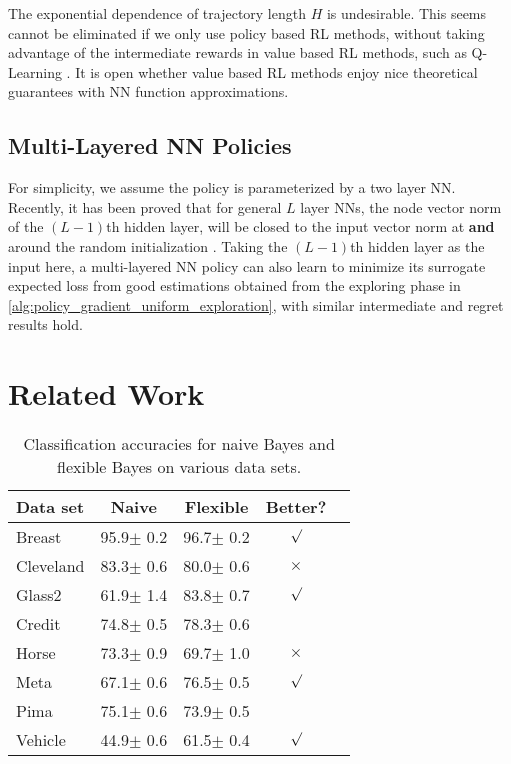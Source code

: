 The exponential dependence of trajectory length $H$ is undesirable. This seems cannot be eliminated if we only use policy based RL methods, without taking advantage of the intermediate rewards in value based RL methods, such as Q-Learning \citep{jin2018q}. It is open whether value based RL methods enjoy nice theoretical guarantees with NN function approximations.

\subsection{Multi-Layered NN Policies}

For simplicity, we assume the policy is parameterized by a two layer NN. Recently, it has been proved that for general $L$ layer NNs, the node vector norm of the $(L-1)$th hidden layer, will be closed to the input vector norm at \textbf{and} around the random initialization \citep{allen2018convergenceA,allen2018convergenceB}. Taking the $(L-1)$th hidden layer as the input here, a multi-layered NN policy can also learn to minimize its surrogate expected loss from  good estimations obtained from the exploring phase in \cref{alg:policy_gradient_uniform_exploration}, with similar intermediate and regret results hold.

\section{Related Work}

\nocite{langley00}
\fi

\begin{table}[t]
\caption{Classification accuracies for naive Bayes and flexible
Bayes on various data sets.}
\label{sample-table}
\vskip 0.15in
\begin{center}
\begin{small}
\begin{sc}
\begin{tabular}{lcccr}
\toprule
Data set & Naive & Flexible & Better? \\
\midrule
Breast    & 95.9$\pm$ 0.2& 96.7$\pm$ 0.2& $\surd$ \\
Cleveland & 83.3$\pm$ 0.6& 80.0$\pm$ 0.6& $\times$\\
Glass2    & 61.9$\pm$ 1.4& 83.8$\pm$ 0.7& $\surd$ \\
Credit    & 74.8$\pm$ 0.5& 78.3$\pm$ 0.6&         \\
Horse     & 73.3$\pm$ 0.9& 69.7$\pm$ 1.0& $\times$\\
Meta      & 67.1$\pm$ 0.6& 76.5$\pm$ 0.5& $\surd$ \\
Pima      & 75.1$\pm$ 0.6& 73.9$\pm$ 0.5&         \\
Vehicle   & 44.9$\pm$ 0.6& 61.5$\pm$ 0.4& $\surd$ \\
\bottomrule
\end{tabular}
\end{sc}
\end{small}
\end{center}
\vskip -0.1in
\end{table}
\fi
